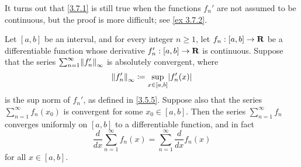 \begin{remark}\label{3.7.2}
  It turns out that \cref{3.7.1} is still true when the functions \(f_n'\) are not assumed to be continuous, but the proof is more difficult;
  see \cref{ex 3.7.2}.
\end{remark}

\begin{corollary}\label{3.7.3}
  Let \([a, b]\) be an interval, and for every integer \(n \geq 1\), let \(f_n : [a, b] \to \mathbf{R}\) be a differentiable function whose derivative \(f_n' : [a, b] \to \mathbf{R}\) is continuous.
  Suppose that the series \(\sum_{n = 1}^\infty \norm*{f_n'}_\infty\) is absolutely convergent, where
  \[
    \norm*{f_n'}_\infty \coloneqq \sup_{x \in [a, b]} \abs{f_n'(x)}
  \]
  is the sup norm of \(f_n'\), as defined in \cref{3.5.5}.
  Suppose also that the series \(\sum_{n = 1}^\infty f_n(x_0)\) is convergent for some \(x_0 \in [a, b]\).
  Then the series \(\sum_{n = 1}^\infty f_n\) converges uniformly on \([a, b]\) to a differentiable function, and in fact
  \[
    \frac{d}{dx} \sum_{n = 1}^\infty f_n(x) = \sum_{n = 1}^\infty \frac{d}{dx} f_n(x)
  \]
  for all \(x \in [a, b]\).
\end{corollary}

